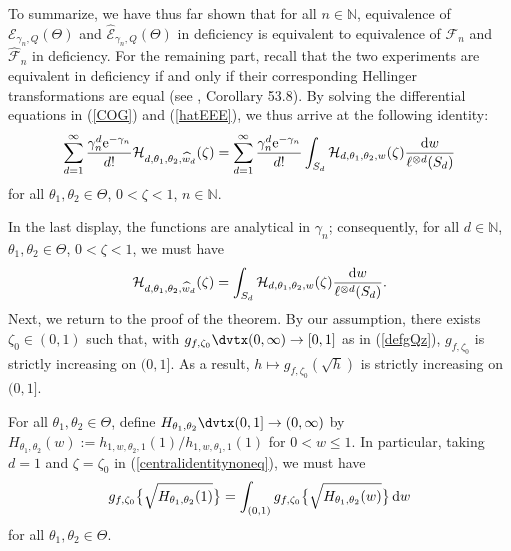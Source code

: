 \documentclass[number,citesort,seceqn,dvips]{arxbj}
\newcommand{\eqref}[1]{(\ref{#1})}
\newcommand{\NN}{\mathbb{N}}
\newcommand{\EEE}{{\mathcal E}}
\newcommand{\FFF}{{\mathcal F}}
\newcommand{\HHH}{{\mathcal H}}
\begin{document}
To summarize, we have thus far shown that for all $n\in\NN$,
equivalence of $\EEE_{\gamma_n,Q}(\Theta)$ and
$\widehat\EEE_{\gamma_n,Q}(\Theta)$ in deficiency\vadjust{\goodbreak} is equivalent to
equivalence of $\FFF_{n}$ and $\widehat\FFF_{n}$ in deficiency. For the
remaining part, recall that the two experiments are equivalent in
deficiency if and only if their corresponding Hellinger transformations
are equal (see \cite{St85}, Corollary 53.8). By solving the
differential equations in \eqref{COG} and \eqref{hatEEE}, we thus
arrive at the following identity:\vspace*{-1pt}
%
\[
\sum_{d=1}^\infty\frac{\gamma_n^d\mathrm{e}^{-\gamma_n}}{d!}
\HHH_{d,\theta_1,\theta_2,\widehat w_d}(\zeta) =  \sum
_{d=1}^\infty
\frac{\gamma_n^d\mathrm{e}^{-\gamma_n}}{d!}
\int_{S_d} \HHH_{d,\theta_1,\theta_2,w}(\zeta) \frac{\mathrm{d}w}{\ell
^{\otimes d}(S_d)}\vspace*{-2pt}
\]
%
for all $\theta_1,\theta_2\in\Theta$,
$0 < \zeta < 1$, $n\in\NN$.

In the last display, the functions are analytical in $\gamma_n$;
consequently, for all $d\in\NN$, $\theta_1,\theta_2\in\Theta$,
$0 < \zeta < 1$, we must have\vspace*{-1pt}
%
\begin{equation}\label{centralidentitynoneq}
\HHH_{d,\theta_1,\theta_2,\widehat w_d}(\zeta) =
\int_{S_d} \HHH_{d,\theta_1,\theta_2,w}(\zeta) \frac{\mathrm{d}w}{\ell
^{\otimes
d}(S_d)}.\vspace*{-2pt}
\end{equation}
%
Next, we return to the proof of the theorem. By our assumption, there
exists $\zeta_0\in(0,1)$ such that, with
$g_{f,\zeta_0}\dvtx(0,\infty)\to[0,1]$ as in \eqref{defgQz},
$g_{f, \zeta_0}$ is strictly increasing on $(0,1]$. As a result,
$h\mapsto g_{f, \zeta_0}(\sqrt{h})$ is strictly increasing on $(0,1]$.

For all $\theta_1,\theta_2\in\Theta$, define
$H_{\theta_1,\theta_2}\dvtx(0,1]\to(0,\infty)$ by
$H_{\theta_1,\theta_2}(w):=h_{1,w,\theta_2,1}(1)/h_{1,w,\theta_1,1}(1)$
for $0 < w \le  1$. In particular, taking $d=1$ and $\zeta=\zeta_0$
in \eqref{centralidentitynoneq}, we must have\vspace*{-1pt}
%
\begin{equation}\label{centralidentitynoneq2}
g_{f,\zeta_0} \bigl\{\sqrt{H_{\theta_1,\theta_2}(1)} \bigr\} =
\int_{(0,1)} g_{f,\zeta_0} \bigl\{\sqrt{H_{\theta_1,\theta
_2}(w)} \bigr\}\,\mathrm{d}w\vspace*{-2pt}
\end{equation}
%
for all $\theta_1,\theta_2\in\Theta$.
\end{document}
